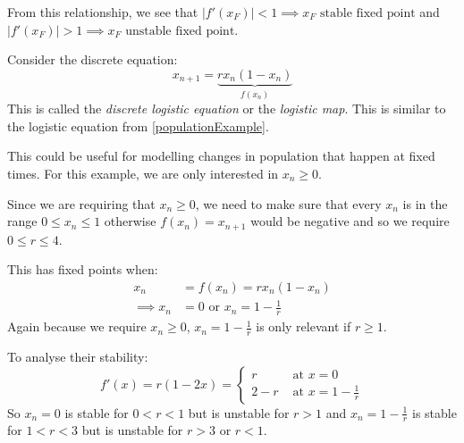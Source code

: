 \documentclass[../main.tex]{subfiles}
\begin{document}
From this relationship, we see that $|f'(x_F)| < 1 \implies \text{$x_F$ stable fixed point}$ and $|f'(x_F)| > 1 \implies \text{$x_F$ unstable fixed point}$.
\begin{example}
  Consider the discrete equation:
  \[
    x_{n+1} = \underbrace{rx_n (1 - x_n)}_{f(x_{n})}
  \]
  This is called the \textit{discrete logistic equation} or the \textit{logistic map}.
  This is similar to the logistic equation from \cref{populationExample}.

  This could be useful for modelling changes in population that happen at fixed times.
  For this example, we are only interested in $x_n \geq 0$.

  \begin{center}
  \end{center}
  Since we are requiring that $x_n \geq 0$, we need to make sure that every $x_n$ is in the range $0 \leq x_{n} \leq 1$ otherwise $f(x_n) = x_{n+1}$ would be negative and so we require $0 \leq r \leq 4$.

  This has fixed points when:
  \begin{align*}
    x_n &= f(x_n) = rx_n(1- x_n) \\
    \implies x_n &= 0 \text{ or } x_n = 1 - \frac{1}{r}
  \end{align*}
  Again because we require $x_n \geq 0$, $x_n = 1-\frac{1}{r}$ is only relevant if $r \geq 1$.

  To analyse their stability:
  \[
    f'(x) = r(1-2x) = \begin{cases}
    r & \text{ at } x = 0 \\
    2 - r & \text{ at } x = 1 - \frac{1}{r}
    \end{cases}
  \]
  So $x_n = 0$ is stable for $0 < r < 1$ but is unstable for $r > 1$ and $x_n = 1 - \frac{1}{r}$ is stable for $1 < r < 3$ but is unstable for $r > 3$ or $r < 1$.


\end{example}
\end{document}
